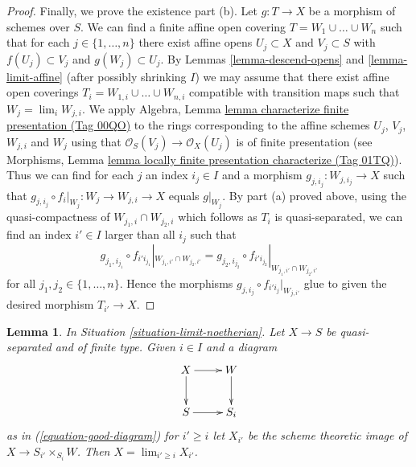 \documentclass{amsart}
\theoremstyle{plain}
\newtheorem{lemma}[subsection]{Lemma}
\theoremstyle{definition}
\theoremstyle{remark}
\numberwithin{equation}{subsection}
\def\lim{\mathop{\mathrm{lim}}\nolimits}
\begin{document}
\begin{proof}
\medskip\noindent
Finally, we prove the existence part (b).
Let $g : T \to X$ be a morphism of schemes over $S$.
We can find a finite affine open covering
$T = W_1 \cup \ldots \cup W_n$ such that for
each $j \in \{1, \ldots, n\}$ there exist affine opens
$U_j \subset X$ and $V_j \subset S$ with $f(U_j) \subset V_j$
and $g(W_j) \subset U_j$. By Lemmas \ref{lemma-descend-opens}
and \ref{lemma-limit-affine}
(after possibly shrinking $I$) we may assume that
there exist affine open coverings $T_i = W_{1, i} \cup \ldots \cup W_{n, i}$
compatible with transition maps such that $W_j = \lim_i W_{j, i}$.
We apply Algebra, Lemma \href{https://stacks.math.columbia.edu/tag/00QO}{lemma characterize finite presentation (Tag 00QO)}
to the rings corresponding to the affine schemes $U_j$, $V_j$, $W_{j, i}$ and
$W_j$ using that $\mathcal{O}_S(V_j) \to \mathcal{O}_X(U_j)$ is of finite
presentation (see Morphisms,
Lemma \href{https://stacks.math.columbia.edu/tag/01TQ}{lemma locally finite presentation characterize (Tag 01TQ)}).
Thus we can find for each $j$ an index $i_j \in I$ and a morphism
$g_{j, i_j} : W_{j, i_j} \to X$ such that
$g_{j, i_j} \circ f_i|_{W_j} : W_j \to W_{j, i} \to X$
equals $g|_{W_j}$. By part (a) proved above, using the quasi-compactness of
$W_{j_1, i} \cap W_{j_2, i}$ which follows as $T_i$ is quasi-separated,
we can find an index $i' \in I$ larger than all $i_j$ such that
$$
g_{j_1, i_{j_1}} \circ f_{i'i_{j_1}}|_{W_{j_1, i'} \cap W_{j_2, i'}} =
g_{j_2, i_{j_2}} \circ f_{i'i_{j_2}}|_{W_{j_1, i'} \cap W_{j_2, i'}}
$$
for all $j_1, j_2 \in \{1, \ldots, n\}$. Hence the morphisms
$g_{j, i_j} \circ f_{i'i_j}|_{W_{j, i'}}$ glue to given the
desired morphism $T_{i'} \to X$.
\end{proof}


\begin{lemma}
\label{lemma-limit-from-good-diagram}
In Situation \ref{situation-limit-noetherian}.
Let $X \to S$ be quasi-separated and of finite type.
Given $i \in I$ and a diagram
$$
\vcenter{
\xymatrix{
X \ar[r] \ar[d] & W \ar[d] \\
S \ar[r] & S_i
}
}
$$
as in (\ref{equation-good-diagram}) for $i' \geq i$ let
$X_{i'}$ be the scheme theoretic image of $X \to S_{i'} \times_{S_i} W$.
Then $X = \lim_{i' \geq i} X_{i'}$.
\end{lemma}
\end{document}
